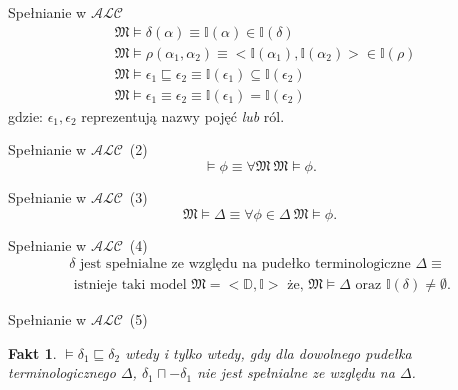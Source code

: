 \documentclass{beamer}
\newtheorem{fakt}{Fakt}
\begin{document}
\begin{frame}{Spełnianie w $\mathcal{ALC}$}
%
\begin{eqnarray}
\label{sat-AL}
& \mathfrak{M} \vDash \delta(\alpha) \equiv \mathbb{I}(\alpha) \in \mathbb{I}(\delta) \\
%
& \mathfrak{M} \vDash \rho(\alpha_1, \alpha_2) \equiv <\mathbb{I}(\alpha_1), \mathbb{I}(\alpha_2)> \in \mathbb{I}(\rho) \\
%
& \mathfrak{M} \vDash \epsilon_{1} \sqsubseteq \epsilon_{2} \equiv \mathbb{I}(\epsilon_{1}) \subseteq \mathbb{I}(\epsilon_{2}) \\
%
& \mathfrak{M} \vDash \epsilon_{1} \equiv \epsilon_{2} \equiv \mathbb{I}(\epsilon_{1}) = \mathbb{I}(\epsilon_{2})
\end{eqnarray}
%
gdzie: $\epsilon_{1}, \epsilon_{2}$ reprezentują nazwy pojęć \emph{lub} ról.
\end{frame}

\begin{frame}{Spełnianie w $\mathcal{ALC}$~(2)}
%
\begin{equation}
\vDash \phi \equiv \forall \mathfrak{M}~ \mathfrak{M}\vDash \phi.
\end{equation}
\end{frame}

\begin{frame}{Spełnianie w $\mathcal{ALC}$~(3)}
%
\begin{equation}
\mathfrak{M} \vDash \Delta \equiv \forall \phi \in \Delta ~\mathfrak{M} \vDash \phi.
\end{equation}
\end{frame}

\begin{frame}{Spełnianie w $\mathcal{ALC}$~(4)}
%
\begin{eqnarray}
\delta \text{ jest spełnialne ze względu na pudełko terminologiczne } \Delta \equiv \nonumber \\ 
\text{ istnieje taki model } \mathfrak{M}=<\mathbb{D}, \mathbb{I}> \text{ że, } \mathfrak{M}\vDash \Delta \text{ oraz } \mathbb{I}(\delta) \neq \emptyset.
\end{eqnarray}
\end{frame}

\begin{frame}{Spełnianie w $\mathcal{ALC}$~(5)}
%
\begin{fakt}
$\vDash \delta_{1} \sqsubseteq \delta_{2}$ wtedy i tylko wtedy, gdy dla dowolnego pudełka terminologicznego $\Delta$, $\delta_1 \sqcap - \delta_1$ nie jest spełnialne ze względu na $\Delta$.
\end{fakt}
\end{frame}
\end{document}
